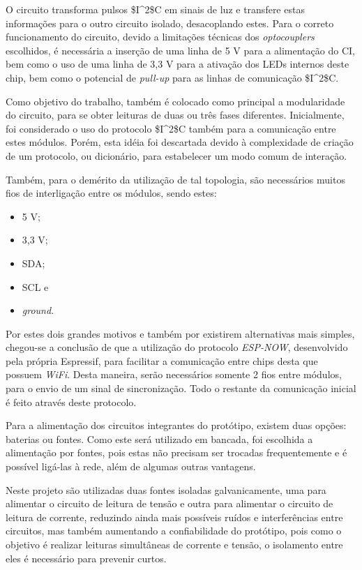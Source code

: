 O circuito transforma pulsos \gls{$I^2$C} em sinais de luz e transfere estas informações para o outro circuito isolado, desacoplando estes. Para o correto funcionamento do circuito, devido a limitações técnicas dos \textit{optocouplers} escolhidos, é necessária a inserção de uma linha de 5 V para a alimentação do \gls{CI}, bem como o uso de uma linha de 3,3 V para a ativação dos LEDs internos deste chip, bem como o potencial de \textit{pull-up} para as linhas de comunicação \gls{$I^2$C}.

Como objetivo do trabalho, também é colocado como principal a modularidade do circuito, para se obter leituras de duas ou três fases diferentes. Inicialmente, foi considerado o uso do protocolo \gls{$I^2$C} também para a comunicação entre estes módulos. Porém, esta idéia foi descartada devido à complexidade de criação de um protocolo, ou dicionário, para estabelecer um modo comum de interação.

Também, para o demérito da utilização de tal topologia, são necessários muitos fios de interligação entre os módulos, sendo estes:

\begin{itemize}
    \item 5 V;
    \item 3,3 V;
    \item SDA;
    \item SCL e
    \item \textit{ground}.
\end{itemize}

Por estes dois grandes motivos e também por existirem alternativas mais simples, chegou-se a conclusão de que a utilização do protocolo \textit{ESP-NOW}, desenvolvido pela própria Espressif, para facilitar a comunicação entre chips desta que possuem \textit{WiFi}. Desta maneira, serão necessários somente 2 fios entre módulos, para o envio de um sinal de sincronização. Todo o restante da comunicação inicial é feito através deste protocolo.

Para a alimentação dos circuitos integrantes do protótipo, existem duas opções: baterias ou fontes. Como este será utilizado em bancada, foi escolhida a alimentação por fontes, pois estas não precisam ser trocadas frequentemente e é possível ligá-las à rede, além de algumas outras vantagens.

Neste projeto são utilizadas duas fontes isoladas galvanicamente, uma para alimentar o circuito de leitura de tensão e outra para alimentar o circuito de leitura de corrente, reduzindo ainda mais possíveis ruídos e interferências entre circuitos, mas também aumentando a confiabilidade do protótipo, pois como o objetivo é realizar leituras simultâneas de corrente e tensão, o isolamento entre eles é necessário para prevenir curtos.

